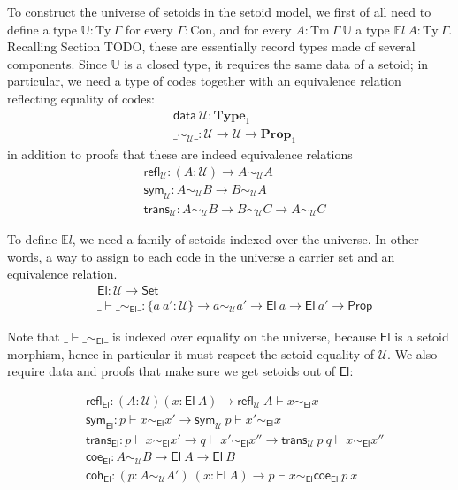 \documentclass{easychair}
\newcommand{\GG}{\Gamma}
\newcommand{\setoidU}{\mathcal{U}}
\newcommand{\Set}{\textsf{Set}}
\newcommand{\mType}{\mathbf{Type}}
\newcommand{\Prop}{\textsf{Prop}}
\newcommand{\mProp}{\mathbf{Prop}}
\newcommand{\Con}{\mathrm{Con}}
\newcommand{\Ty}{\mathrm{Ty}}
\newcommand{\Tm}{\mathrm{Tm}}
\newcommand{\El}{\textsf{El}}
\newcommand{\Uty}{\mathds{U}}
\newcommand{\EL}{\mathds{E}l}
\newcommand{\reflu}{\textsf{refl}_\setoidU}
\newcommand{\symu}{\textsf{sym}_\setoidU}
\newcommand{\transu}{\textsf{trans}_\setoidU}
\newcommand{\coeel}{\textsf{coe}_\El}
\newcommand{\cohel}{\textsf{coh}_\El}
\newcommand{\equ}[2]{#1 \sim_\setoidU #2}
\newcommand{\eqel}[3]{#1 \vdash #2 \sim_\El #3}
\begin{document}
To construct the universe of setoids in the setoid model, we first of all need
to define a type $\Uty : \Ty\ \GG$ for every $\GG : \Con$, and for every $A :
\Tm\ \GG\ \Uty$ a type $\mathds{E}l\ A : \Ty\ \GG$. Recalling Section TODO,
these are essentially record types made of several components. Since $\Uty$ is a
closed type, it requires the same data of a setoid; in particular, we need a type
of codes together with an equivalence relation reflecting equality of codes:
%
\begin{align*}
  & \textsf{data} \ \setoidU : \mType_1 \\
  & \_\sim_\setoidU\_ : \setoidU \to \setoidU \to \mProp_1
\end{align*}
%
in addition to proofs that these are indeed equivalence relations
%
\begin{align*}
  & \textsf{refl}_\setoidU : (A : \setoidU) \to \equ{A}{A} \\
  & \textsf{sym}_\setoidU : \equ{A}{B} \to \equ{B}{A} \\
  & \textsf{trans}_\setoidU : \equ{A}{B} \to \equ{B}{C} \to \equ{A}{C}
\end{align*}

To define $\EL$, we need a family of setoids indexed over the universe. In other
words, a way to assign to each code in the universe a carrier set and an
equivalence relation.
%
\begin{align*}
  & \El : \setoidU \to \Set \\
  & \_\vdash\_\sim_\El\_ : \{a\ a' : \setoidU\} \to a \sim_\setoidU a' \to \El\ a \to \El\ a' \to \Prop
\end{align*}

Note that $\eqel{\_}{\_}{\_}$ is indexed over equality on the universe, because
$\El$ is a setoid morphism, hence in particular it must respect the setoid
equality of $\setoidU$.
%
We also require data and proofs that make sure we get setoids out of $\El$:

\begin{align*}
  & \textsf{refl}_\El : (A : \setoidU) (x : \El\ A) \to \eqel{\reflu\ A}{x}{x} \\
  & \textsf{sym}_\El : \eqel{p}{x}{x'} \to \eqel{\symu\ p}{x'}{x} \\
  & \textsf{trans}_\El : \eqel{p}{x}{x'} \to \eqel{q}{x'}{x''} \to \eqel{\transu\ p\ q}{x}{x''} \\
  & \coeel : \equ{A}{B} \to \El\ A \to \El\ B \\
  & \cohel : (p : \equ{A}{A'}) \ (x : \El\ A) \to \eqel{p}{x}{\coeel\ p\ x}
\end{align*}
\end{document}
